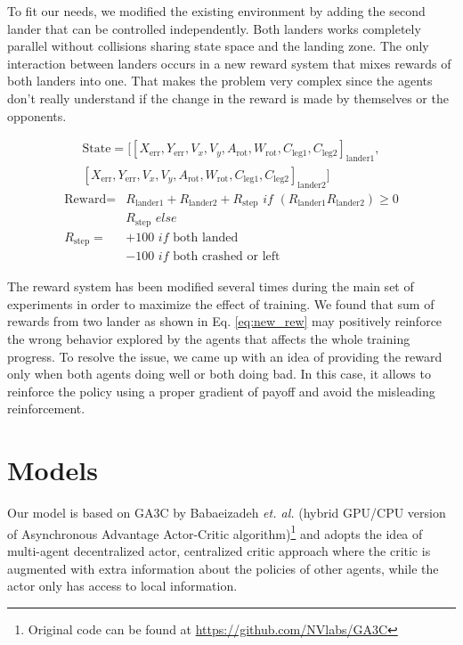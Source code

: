 \documentclass[12pt, letter]{article}
\begin{document}
To fit our needs, we modified the existing environment by adding the second lander that can be controlled independently. Both landers works completely parallel without collisions sharing state space and the landing zone. The only interaction between landers occurs in a new reward system that mixes rewards of both landers into one. That makes the problem very complex since the agents don't really understand if the change in the reward is made by themselves or the opponents.

\begin{align}
\text{State} = [[X_\text{err},Y_\text{err}, V_{x}, V_{y}, A_\text{rot},W_\text{rot},C_\text{leg1},C_\text{leg2}]_\text{lander1},\\
[X_\text{err},Y_\text{err}, V_{x}, V_{y}, A_\text{rot},W_\text{rot},C_\text{leg1},C_\text{leg2}]_\text{lander2}] 
\end{align}
\begin{align}
\text{Reward} = &R_\text{lander1} + R_\text{lander2} + R_\text{step} \textit{ if } (R_\text{lander1} R_\text{lander2}) \ge 0
\label{eq:new_rew}\\
&R_\text{step} \textit{ else} \\
R_\text{step} = &+100\textit{ if } \text{both landed}\\
&-100\textit{ if } \text{both crashed or left}
\end{align}

The reward system has been modified several times during the main set of experiments in order to maximize the effect of training. We found that sum of rewards from two lander as shown in Eq. \ref{eq:new_rew} may positively reinforce the wrong behavior explored by the agents that affects the whole training progress. To resolve the issue, we came up with an idea of providing the reward only when both agents doing well or both doing bad. In this case, it allows to reinforce the policy using a proper gradient of payoff and avoid the misleading reinforcement.

\section{Models}

Our model is based on GA3C by Babaeizadeh {\it et. al.}\cite{babaeizadeh2016} (hybrid GPU/CPU version of Asynchronous Advantage Actor-Critic algorithm)\footnote{Original code can be found at \href{https://github.com/NVlabs/GA3C}{https://github.com/NVlabs/GA3C}} and adopts the idea of multi-agent decentralized actor, centralized critic approach where the critic is augmented with extra information about the policies of other agents, while the actor only has access
to local information\cite{lowe2017}.
\end{document}
